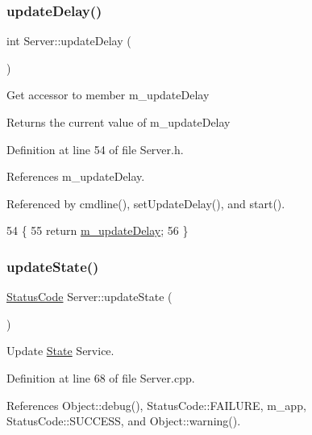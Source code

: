 \subsubsection{\texorpdfstring{update\+Delay()}{updateDelay()}}
{\footnotesize\ttfamily int Server\+::update\+Delay (\begin{DoxyParamCaption}{ }\end{DoxyParamCaption})\hspace{0.3cm}{\ttfamily [inline]}}

Get accessor to member m\+\_\+update\+Delay \begin{DoxyReturn}{Returns}
the current value of m\+\_\+update\+Delay 
\end{DoxyReturn}


Definition at line 54 of file Server.\+h.



References m\+\_\+update\+Delay.



Referenced by cmdline(), set\+Update\+Delay(), and start().


\begin{DoxyCode}
54                      \{
55     \textcolor{keywordflow}{return} \hyperlink{classServer_ae991d55181bff0552a34278ea9f76735}{m\_updateDelay};
56   \}
\end{DoxyCode}
\mbox{\label{classServer_abaa0b878f4f96454339f1989ec12cc6b}} 
\subsubsection{\texorpdfstring{update\+State()}{updateState()}}
{\footnotesize\ttfamily \hyperlink{classStatusCode}{Status\+Code} Server\+::update\+State (\begin{DoxyParamCaption}{ }\end{DoxyParamCaption})}



Update \hyperlink{classState}{State} Service. 



Definition at line 68 of file Server.\+cpp.



References Object\+::debug(), Status\+Code\+::\+F\+A\+I\+L\+U\+RE, m\+\_\+app, Status\+Code\+::\+S\+U\+C\+C\+E\+SS, and Object\+::warning().



